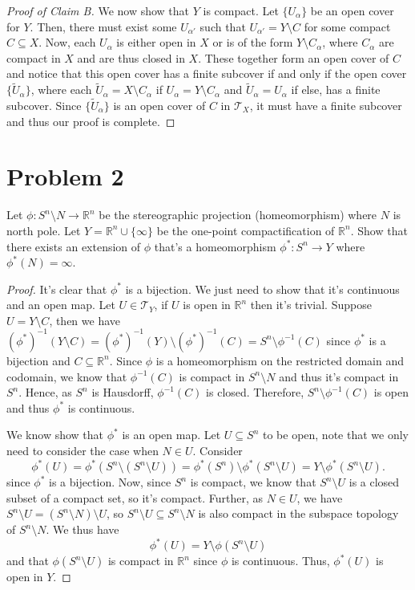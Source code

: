 \documentclass[11pt]{article} %
\newcommand{\R}{\mathbb{R}}
\begin{document}
\begin{proof}[Proof of Claim B]
We now show that $Y$ is compact. Let $\{U_\alpha\}$ be an open cover for $Y$. Then, there must exist some $U_{\alpha'}$ such that $U_{\alpha'} = Y\setminus C$ for some compact $C\subseteq X$. Now, each $U_\alpha$ is either open in $X$ or is of the form $Y\setminus C_\alpha$, where $C_\alpha$ are compact in $X$ and are thus closed in $X$. These together form an open cover of $C$ and notice that this open cover has a finite subcover if and only if the open cover $\{\widetilde{U}_\alpha\}$, where each $\widetilde{U}_\alpha = X\setminus C_\alpha$ if $U_\alpha = Y\setminus C_\alpha$ and $\widetilde{U}_\alpha = U_\alpha$ if else, has a finite subcover. Since $\{\widetilde{U}_\alpha\}$ is an open cover of $C$ in $\mathcal{T}_X$, it must have a finite subcover and thus our proof is complete.
\end{proof}

\section*{Problem 2}
Let $\phi:S^n\setminus N\to \R^n$ be the stereographic projection (homeomorphism) where $N$ is north pole. Let $Y = \R^n\cup\{\infty\}$ be the one-point compactification of $\R^n$. Show that there exists an extension of $\phi$ that's a homeomorphism $\phi^*:S^n\to Y$ where $\phi^*(N)=\infty$.

\begin{proof}
It's clear that $\phi^*$ is a bijection. We just need to show that it's continuous and an open map. Let $U\in \mathcal{T}_Y$, if $U$ is open in $\R^n$ then it's trivial. Suppose $U = Y\setminus C$, then we have $(\phi^*)^{-1}(Y\setminus C) = (\phi^*)^{-1}(Y)\setminus (\phi^*)^{-1}(C) = S^n\setminus \phi^{-1}(C)$ since $\phi^*$ is a bijection and $C\subseteq \R^n$. Since $\phi$ is a homeomorphism on the restricted domain and codomain, we know that $\phi^{-1}(C)$ is compact in $S^n\setminus N$ and thus it's compact in $S^n$. Hence, as $S^n$ is Hausdorff, $\phi^{-1}(C)$ is closed. Therefore, $S^n\setminus \phi^{-1}(C)$ is open and thus $\phi^*$ is continuous.

We know show that $\phi^*$ is an open map. Let $U\subseteq S^n$ to be open, note that we only need to consider the case when $N\in U$. Consider
\[\phi^*(U) = \phi^*(S^n\setminus (S^n\setminus U)) = \phi^*(S^n)\setminus \phi^*(S^n\setminus U) = Y\setminus \phi^*(S^n\setminus U).\]
since $\phi^*$ is a bijection. Now, since $S^n$ is compact, we know that $S^n\setminus U$ is a closed subset of a compact set, so it's compact. Further, as $N\in U$, we have $S^n\setminus U = (S^n\setminus N)\setminus U$, so $S^n\setminus U\subseteq S^n\setminus N$ is also compact in the subspace topology of $S^n\setminus N$. We thus have 
\[\phi^*(U) = Y\setminus \phi(S^n\setminus U)\]
and that $\phi(S^n\setminus U)$ is compact in $\R^n$ since $\phi$ is continuous. Thus, $\phi^*(U)$ is open in $Y$.
\end{proof}
\end{document}
